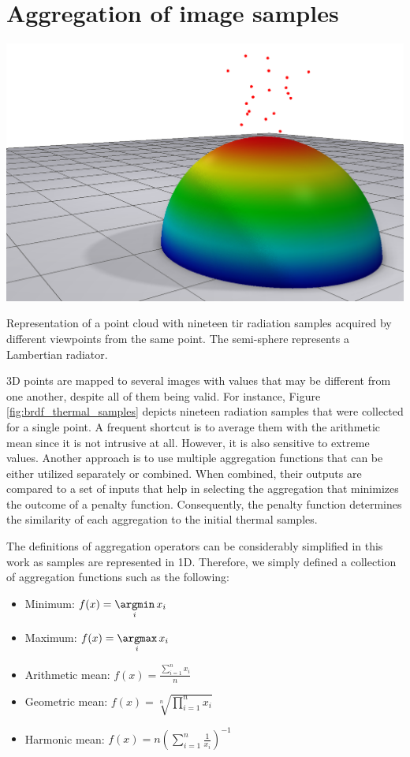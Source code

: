 \section{Aggregation of image samples}

\begin{marginfigure}[.0cm]
	\includegraphics{figs/thermal_projection/brdf_thermal.png}
	\caption{Representation of a point cloud with nineteen \acrshort{tir} radiation samples acquired by different viewpoints from the same point. The semi-sphere represents a Lambertian radiator. }
	\label{fig:brdf_thermal_samples}
\end{marginfigure}
3D points are mapped to several images with values that may be different from one another, despite all of them being valid. For instance, Figure \ref{fig:brdf_thermal_samples} depicts nineteen radiation samples that were collected for a single point. A frequent shortcut is to average them with the arithmetic mean \cite{javadnejad_photogrammetric_2020} since it is not intrusive at all. However, it is also sensitive to extreme values. Another approach is to use multiple aggregation functions that can be either utilized separately or combined. When combined, their outputs are compared to a set of inputs that help in selecting the aggregation that minimizes the outcome of a penalty function. Consequently, the penalty function determines the similarity of each aggregation to the initial thermal samples.

The definitions of aggregation operators can be considerably simplified in this work as samples are represented in 1D. Therefore, we simply defined a collection of aggregation functions such as the following:
\begin{itemize}
    \setlength\itemsep{0.3em}
    \item Minimum: $f(x) = \underset{i}{\argmin}\, x_i$
    \item Maximum: $f(x) = \underset{i}{\argmax}\, x_i$
    \setlength\itemsep{-0.1em}
    \item Arithmetic mean: $f(x) = \frac{\sum_{i=1}^{n} x_i}{n}$
    \setlength\itemsep{0.55em}
    \item Geometric mean: $f(x) = \sqrt[n]{\prod_{i=1}^{n} x_i}$
    \setlength\itemsep{0.3em}
    \item Harmonic mean: $f(x) = n\left( \sum_{i=1}^{n} \frac{1}{x_i} \right)^{-1}$
\end{itemize}

